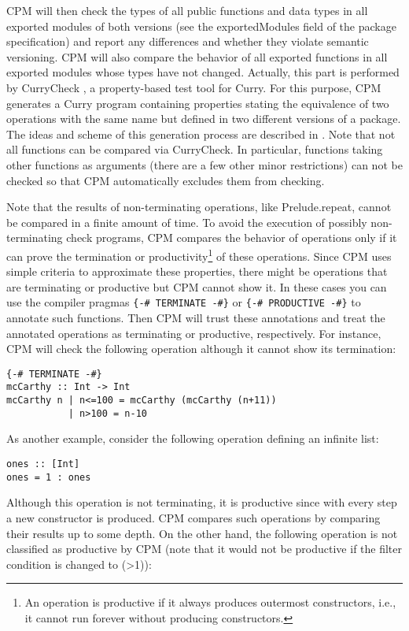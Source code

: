 \documentclass[11pt]{article}
\renewcommand{\tt}{\usefont{OT1}{cmtt}{m}{n}\selectfont}
\newcommand{\codefont}{\small\tt}
\newcommand{\code}[1]{\mbox{\codefont #1}}
\begin{document}
CPM will then check the types of all public functions and data types in all
exported modules of both versions (see the \code{exportedModules} field of the
package specification) and report any differences and whether they violate 
semantic versioning.
CPM will also compare the behavior of all exported functions
in all exported modules whose types have not changed.
Actually, this part is performed by CurryCheck \cite{Hanus16LOPSTR},
a property-based test tool for Curry.
For this purpose, CPM generates a Curry program containing
properties stating the equivalence
of two operations with the same name but defined in two different
versions of a package.
The ideas and scheme of this generation process are
described in \cite{Hanus17ICLP}.
Note that not all functions can be compared via CurryCheck.
In particular, functions taking other functions as arguments
(there are a few other minor restrictions)
can not be checked so that CPM automatically excludes them from checking.

Note that the results of non-terminating operations, like \code{Prelude.repeat},
cannot be compared in a finite amount of time.
To avoid the execution of possibly non-terminating check programs,
CPM compares the behavior of operations
only if it can prove the termination or productivity\footnote{%
An operation is productive if it always produces outermost constructors,
i.e., it cannot run forever without producing constructors.}
of these operations.
Since CPM uses simple criteria to approximate these properties,
there might be operations that are terminating or productive
but CPM cannot show it. In these cases you can use the compiler pragmas
\verb|{-# TERMINATE -#}| or \verb|{-# PRODUCTIVE -#}| to annotate such
functions. Then CPM will trust these annotations and treat
the annotated operations as terminating or productive, respectively.
For instance, CPM will check the following operation although
it cannot show its termination:

\begin{lstlisting}
{-# TERMINATE -#}
mcCarthy :: Int -> Int
mcCarthy n | n<=100 = mcCarthy (mcCarthy (n+11))
           | n>100 = n-10
\end{lstlisting}
%
As another example, consider the following operation defining
an infinite list:

\begin{lstlisting}
ones :: [Int]
ones = 1 : ones
\end{lstlisting}
%
Although this operation is not terminating, it is productive
since with every step a new constructor is produced.
CPM compares such operations by comparing their results up to
some depth.
On the other hand, the following operation is not classified
as productive by CPM (note that it would not be productive if the
filter condition is changed to \code{(>1)}):
\end{document}
